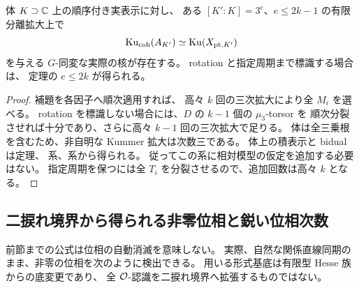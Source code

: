 \begin{corollary}
\label{mbpd:cor:field-degree}
体 $K\supset\mathbb C$ 上の順序付き実表示に対し、
ある $[K':K]=3^e$、$e\leq2k-1$ の有限分離拡大上で
\[
 \operatorname{Ku}_{\mathrm{coh}}(A_{K'})\simeq\operatorname{Ku}(X_{\mathrm{pt},K'})
\]
を与える $G$-同変な実際の核が存在する。
rotation と指定周期まで標識する場合は、
定理の $e\leq2k$ が得られる。
\end{corollary}
\begin{proof}
補題を各因子へ順次適用すれば、
高々 $k$ 回の三次拡大により全 $M_i$ を選べる。
rotation を標識しない場合には、$D$ の $k-1$ 個の $\mu_3$-torsor を
順次分裂させれば十分であり、さらに高々 $k-1$ 回の三次拡大で足りる。
体は全三乗根を含むため、非自明な Kummer 拡大は次数三である。
体上の積表示と bidual は定理、
系、系から得られる。
従ってこの系に相対模型の仮定を追加する必要はない。
指定周期を保つには全 $T_i$ を分裂させるので、追加回数は高々 $k$ となる。
\end{proof}

\subsection{二捩れ境界から得られる非零位相と鋭い位相次数}

前節までの公式は位相の自動消滅を意味しない。
実際、自然な関係直線同期のまま、非零の位相を次のように検出できる。
用いる形式基底は有限型 Hesse 族からの底変更であり、
全 $\mathcal O$-認識を二捩れ境界へ拡張するものではない。

